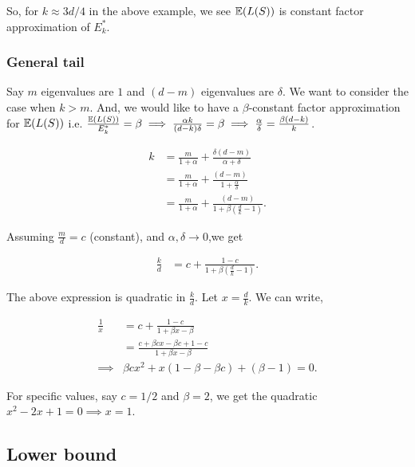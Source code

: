 \documentclass[12pt]{sty/colt2019/colt2018-arxiv}
\begin{document}
So, for $k \approx 3d/4$ in the above example, we see $\mathbb E(L(S))$ is constant factor approximation of $E^*_k$.

 

\subsubsection{General tail} 
Say $m$ eigenvalues are $1$ and $(d-m)$ eigenvalues are $\delta$. We want to consider the case when $k>m$. And, we would like to have a $\beta$-constant factor approximation for $\mathbb E(L(S))$ i.e. $\frac{\mathbb E(L(S))}{E^*_k} = \beta \implies \frac{\alpha k}{(d-k)\delta} = \beta \implies \frac{\alpha}{\delta} = \frac{\beta(d-k)}{k}$. 



\begin{align*}
k &= \frac{m}{1+ \alpha} + \frac{\delta(d-m)}{\alpha + \delta} \\ 
& = \frac{m}{1+\alpha} + \frac{(d-m)}{1 + \frac{\alpha}{\delta}} \\
& = \frac{m}{1+\alpha} + \frac{(d-m)}{1 + \beta (\frac{d}{k} - 1)}.
\end{align*}

Assuming $\frac{m}{d} = c$ (constant), and $\alpha, \delta \rightarrow 0$,we get 

\begin{align*}
\frac{k}{d} &= c + \frac{1-c}{1 + \beta (\frac{d}{k} - 1)}.
\end{align*}

The above expression is quadratic in $\frac{k}{d}$. Let $x = \frac{d}{k}$. We can write, 

\begin{align*}
\frac{1}{x} &= c+ \frac{1-c}{1 + \beta x - \beta}\\
 & = \frac{c + \beta c x - \beta c + 1 -c }{1 + \beta x - \beta}\\      
 \implies & \beta c x^2 + x (1-\beta - \beta c) +(\beta -1) = 0.
\end{align*}

For specific values, say $c=1/2$ and $\beta=2$, we get the quadratic $x^2 - 2x +1 = 0 \implies x =1$. 

\subsection{Lower bound}
\end{document}
